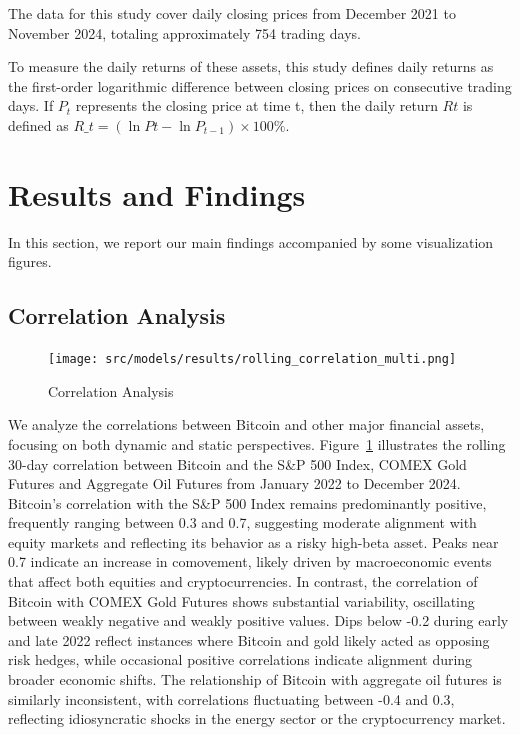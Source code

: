 \documentclass{article}
\begin{document}
The data for this study cover daily closing prices from December 2021 to November 2024, totaling approximately 754 trading days.



To measure the daily returns of these assets, this study defines daily returns as the first-order logarithmic difference between closing prices on consecutive trading days. If $P_t$  represents the closing price at time t, then the daily return $Rt$ is defined as $R\_t = (\ln Pt - \ln P_{t-1}) \times 100\%$. 

\section{Results and Findings}





In this section, we report our main findings accompanied by some visualization figures.

\subsection{Correlation Analysis}




\begin{figure}[h!]
    \centering
    \texttt{[image: src/models/results/rolling\_correlation\_multi.png]}
    \caption{Correlation Analysis}
    \label{volatility}
    
\end{figure}


We analyze the correlations between Bitcoin and other major financial assets, focusing on both dynamic and static perspectives. Figure~\ref{volatility} illustrates the rolling 30-day correlation between Bitcoin and the S\&P 500 Index, COMEX Gold Futures and Aggregate Oil Futures from January 2022 to December 2024. Bitcoin’s correlation with the S\&P 500 Index remains predominantly positive, frequently ranging between 0.3 and 0.7, suggesting moderate alignment with equity markets and reflecting its behavior as a risky high-beta asset. Peaks near 0.7 indicate an increase in comovement, likely driven by macroeconomic events that affect both equities and cryptocurrencies. In contrast, the correlation of Bitcoin with COMEX Gold Futures shows substantial variability, oscillating between weakly negative and weakly positive values. Dips below -0.2 during early and late 2022 reflect instances where Bitcoin and gold likely acted as opposing risk hedges, while occasional positive correlations indicate alignment during broader economic shifts. The relationship of Bitcoin with aggregate oil futures is similarly inconsistent, with correlations fluctuating between -0.4 and 0.3, reflecting idiosyncratic shocks in the energy sector or the cryptocurrency market.
\end{document}
